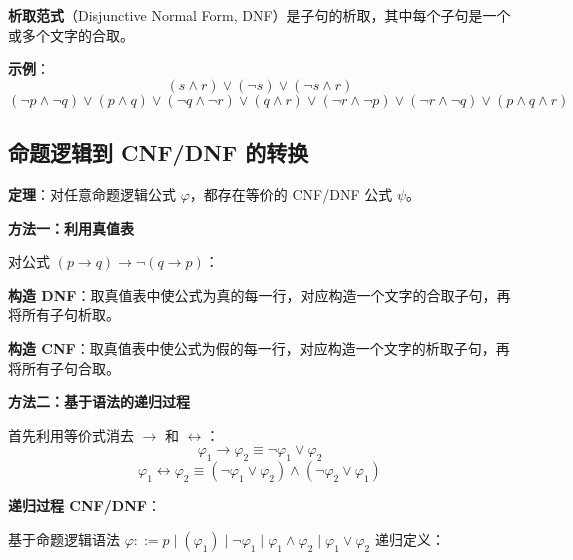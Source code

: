 \documentclass[UTF8,11pt,a4paper]{ctexbook}   %
\theoremstyle{definition}
\begin{document}
\textbf{析取范式}（Disjunctive Normal Form, DNF）是子句的析取，其中每个子句是一个或多个文字的合取。

\textbf{示例}：
\[
(s \land r) \lor (\neg s) \lor (\neg s \land r)
\]
\[
(\neg p \land \neg q) \lor (p \land q) \lor (\neg q \land \neg r) \lor (q \land r) \lor (\neg r \land \neg p) \lor (\neg r \land \neg q) \lor (p \land q \land r)
\]

\subsection{命题逻辑到 CNF/DNF 的转换}

\textbf{定理}：对任意命题逻辑公式 $\varphi$，都存在等价的 CNF/DNF 公式 $\psi$。

\textbf{方法一：利用真值表}

对公式 $(p \to q) \to \neg(q \to p)$：

\textbf{构造 DNF}：取真值表中使公式为真的每一行，对应构造一个文字的合取子句，再将所有子句析取。

\textbf{构造 CNF}：取真值表中使公式为假的每一行，对应构造一个文字的析取子句，再将所有子句合取。

\textbf{方法二：基于语法的递归过程}

首先利用等价式消去 $\to$ 和 $\leftrightarrow$：
\[
\varphi_1 \to \varphi_2 \equiv \neg\varphi_1 \lor \varphi_2
\]
\[
\varphi_1 \leftrightarrow \varphi_2 \equiv (\neg\varphi_1 \lor \varphi_2) \land (\neg\varphi_2 \lor \varphi_1)
\]

\textbf{递归过程 CNF/DNF}：

基于命题逻辑语法 $\varphi ::= p \mid (\varphi_1) \mid \neg\varphi_1 \mid \varphi_1 \land \varphi_2 \mid \varphi_1 \lor \varphi_2$ 递归定义：
\end{document}
